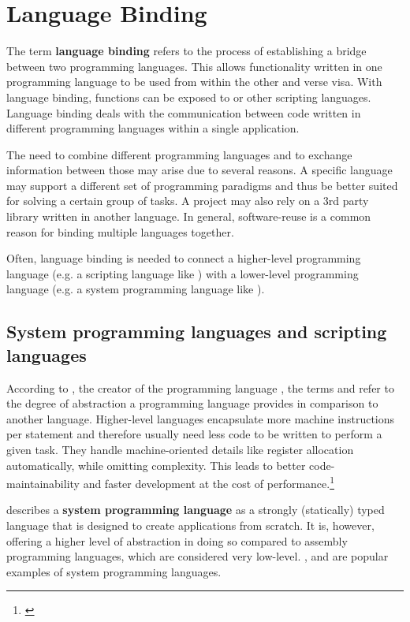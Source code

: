 \chapter{Language Binding}
\label{chap:LanguageBinding}

The term \textbf{language binding} refers to the process of establishing a bridge between two programming languages. This allows functionality written in one programming language to be used from within the other and verse visa. With language binding,  functions can be exposed to  or other scripting languages. Language binding deals with the communication between code written in different programming languages within a single application.

The need to combine different programming languages and to exchange information between those may arise due to several reasons. A specific language may support a different set of programming paradigms and thus be better suited for solving a certain group of tasks. A project may also rely on a 3rd party library written in another language. In general, software-reuse is a common reason for binding multiple languages together.

Often, language binding is needed to connect a higher-level programming language (e.g. a scripting language like ) with a lower-level programming language (e.g. a system programming language like ).

\section{System programming languages and scripting languages}

According to , the creator of the programming language , the terms \textbf{} and \textbf{} refer to the degree of abstraction a programming language provides in comparison to another language. Higher-level languages encapsulate more machine instructions per statement and therefore usually need less code to be written to perform a given task. They handle machine-oriented details like register allocation automatically, while omitting complexity. This leads to better code-maintainability and faster development at the cost of performance.\footnote{\citep{Ousterhout}}

 describes a \textbf{system programming language} as a strongly (statically) typed language that is designed to create applications from scratch. It is, however, offering a higher level of abstraction in doing so compared to assembly programming languages, which are considered very low-level. ,  and  are popular examples of system programming languages.

